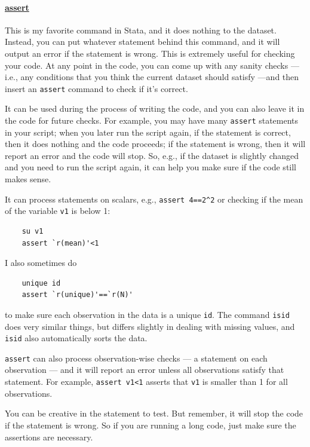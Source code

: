 \paragraph{\underline{assert}} This is my favorite command in Stata, and it does nothing to the dataset. Instead, you can put whatever statement behind this command, and it will output an error if the statement is wrong. This is extremely useful for checking your code. At any point in the code, you can come up with any sanity checks --- i.e., any conditions that you think the current dataset should satisfy ---and then insert an \verb|assert| command to check if it's correct. 

It can be used during the process of writing the code, and you can also leave it in the code for future checks. For example, you may have many \verb|assert| statements in your script; when you later run the script again, if the statement is correct, then it does nothing and the code proceeds; if the statement is wrong, then it will report an error and the code will stop. So, e.g., if the dataset is slightly changed and you need to run the script again, it can help you make sure if the code still makes sense. 

It can process statements on scalars, e.g., \verb|assert 4==2^2| or checking if the mean of the variable \verb|v1| is below 1:
\begin{verbatim}
    su v1
    assert `r(mean)'<1
\end{verbatim}
I also sometimes do 
\begin{verbatim}
    unique id 
    assert `r(unique)'==`r(N)'
\end{verbatim}
to make sure each observation in the data is a unique \verb|id|. The command \verb|isid| does very similar things, but differs slightly in dealing with missing values, and \verb|isid| also automatically sorts the data. 

\verb|assert| can also process observation-wise checks --- a statement on each observation --- and it will report an error unless all observations satisfy that statement. For example, \verb|assert v1<1| asserts that \verb|v1| is smaller than 1 for all observations. 

You can be creative in the statement to test. But remember, it will stop the code if the statement is wrong. So if you are running a long code, just make sure the assertions are necessary. 

